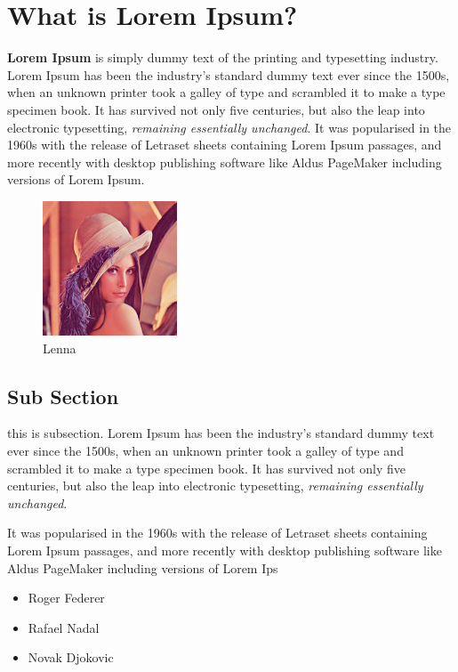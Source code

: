 \documentclass[sigconf]{acmart}
\begin{document}
    \section{What is Lorem Ipsum?}

    \textbf{Lorem Ipsum} is simply dummy text of the printing and typesetting industry. Lorem Ipsum has been the industry's standard dummy \label{intro} text ever since the 1500s, when an unknown printer took a
    galley of type and scrambled it to make a type specimen book. It has survived not only five centuries, but also
    the leap into electronic typesetting, \textit{remaining essentially unchanged}. It was popularised in the 1960s with the release of Letraset sheets containing Lorem Ipsum passages, and more
    recently with desktop publishing software like Aldus PageMaker including versions of Lorem Ipsum.
    \begin{figure}
    \includegraphics[width=4cm, height=4cm]{lenna.png}

    \label{sec2}
    \caption{Lenna}

    \end{figure}
    \subsection{Sub Section}
this is subsection. Lorem Ipsum has been the industry's standard dummy  text ever since the 1500s, when an unknown printer took a galley of type and scrambled it to make a type specimen book. It has survived not only five centuries, but also
    the leap into electronic typesetting, \textit{remaining essentially unchanged}. \par It was popularised in the 1960s with the release of Letraset sheets containing Lorem Ipsum passages, and more
    recently with desktop publishing software like Aldus PageMaker including versions of Lorem Ips

\begin{itemize}
\item Roger Federer
\item Rafael Nadal
\item Novak Djokovic
\end{itemize}
\end{document}
